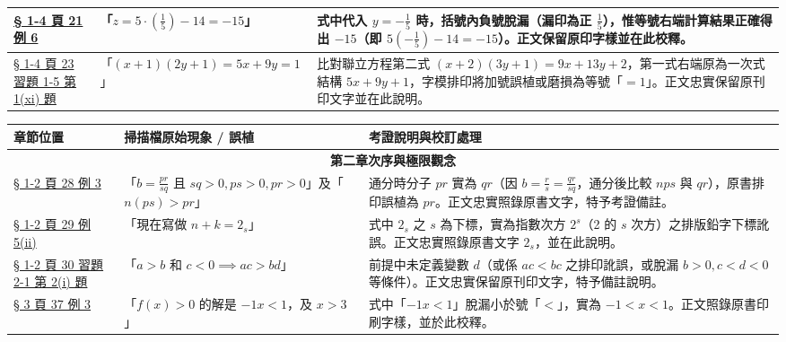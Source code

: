\documentclass[a4paper,12pt,twoside]{article}
\begin{document}
\begin{table}[H]
\begin{tabularx}{\textwidth}{|p{3.0cm}|p{3.8cm}|X|}
\hyperref[note:b2-ch1-ex6-sign]{§ 1-4 頁 21 例 6} & 
「$z = 5\cdot (\frac{1}{5}) - 14 = -15$」 & 
式中代入 $y=-\frac{1}{5}$ 時，括號內負號脫漏（漏印為正 $\frac{1}{5}$），惟等號右端計算結果正確得出 $-15$（即 $5(-\frac{1}{5})-14 = -15$）。正文保留原印字樣並在此校釋。 \\ \hline

\hyperref[note:b2-ch1-ex1-5-q1-11]{§ 1-4 頁 23 習題 1-5 第 1(xi) 題} & 
「$(x+1)(2y+1) = 5x+9y=1$」 & 
比對聯立方程第二式 $(x+2)(3y+1) = 9x+13y+2$，第一式右端原為一次式結構 $5x+9y+1$，字模排印將加號誤植或磨損為等號「$=1$」。正文忠實保留原刊印文字並在此說明。 \\ \hline

\end{tabularx}
\end{table}

\begin{table}[H]
\centering
\small
\renewcommand{\arraystretch}{1.35}
\begin{tabularx}{\textwidth}{|p{3.0cm}|p{3.8cm}|X|}
\hline
\textbf{章節位置} & \textbf{掃描檔原始現象 / 誤植} & \textbf{考證說明與校訂處理} \\ \hline

\multicolumn{3}{|c|}{\textbf{第二章\quad 次序與極限觀念}} \\ \hline

\hyperref[note:b2-ch2-p28-ex3-pr]{§ 1-2 頁 28 例 3} & 
「$b = \frac{pr}{sq}$ 且 $sq>0, ps>0, pr>0$」及「$n(ps)>pr$」 & 
通分時分子 $pr$ 實為 $qr$（因 $b=\frac{r}{s}=\frac{qr}{sq}$，通分後比較 $nps$ 與 $qr$），原書排印誤植為 $pr$。正文忠實照錄原書文字，特予考證備註。 \\ \hline

\hyperref[note:b2-ch2-p29-ex5-subscript]{§ 1-2 頁 29 例 5(ii)} & 
「現在寫做 $n+k=2_s$」 & 
式中 $2_s$ 之 $s$ 為下標，實為指數次方 $2^s$（2 的 $s$ 次方）之排版鉛字下標訛誤。正文忠實照錄原書文字 $2_s$，並在此說明。 \\ \hline

\hyperref[note:b2-ch2-p30-ex2-1-q2i]{§ 1-2 頁 30 習題 2-1 第 2(i) 題} & 
「$a>b \text{ 和 } c<0 \implies ac>bd$」 & 
前提中未定義變數 $d$（或係 $ac<bc$ 之排印訛誤，或脫漏 $b>0, c<d<0$ 等條件）。正文忠實保留原刊印文字，特予備註說明。 \\ \hline

\hyperref[note:b2-ch2-p37-ex3-typo]{§ 3 頁 37 例 3} & 
「$f(x)>0$ 的解是 $-1x<1$，及 $x>3$」 & 
式中「$-1x<1$」脫漏小於號「$<$」，實為 $-1<x<1$。正文照錄原書印刷字樣，並於此校釋。 \\ \hline


\end{tabularx}
\end{table}
\end{document}
